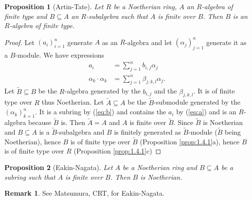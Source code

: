 \documentclass[DIV=14,parskip=half]{scrartcl}
\newtheorem{prop}{Proposition}[subsection]
\theoremstyle{definition}
\newtheorem{rem}{Remark}[subsection]
\begin{document}
 \begin{prop}[Artin-Tate]\label{prop:artinTate}
  Let $R$ be a Noetherian ring, $A$ an $R$-algebra of finite type and $B\subseteq A$ an $R$-subalgebra such that $A$ is finite over $B$. Then $B$ is an $R$-algebra of finite type.
 \end{prop}
 \begin{proof}
 Let $(a_i)_{i=1}^n$ generate $A$ as an $R$-algebra and let $(\alpha_j)_{j=1}^n$ generate it as a $B$-module. We have expressions
 \begin{align*}
  a_i &=\sum_{j=1}^n b_{i,j} \alpha_j\label{eq:a}\tag{*}\\
  \alpha_k\cdot \alpha_k &= \sum_{j=1}^n \beta_{j,k,l} \alpha_j.\label{eq:b}\tag{**}
 \end{align*}
Let $\tilde B\subseteq B$ be the $R$-algebra generated by the $b_{i,j}$ and the $\beta_{j,k,l}$. It is of finite type over $R$ thus Noetherian. Let $\tilde A\subseteq A$ be the $\tilde B$-submodule generated by the $(\alpha_k)_{k=1}^n$. It is a subring by (\ref{eq:b}) and contains the $a_i$ by (\ref{eq:a}) and is an $R$-algebra because $\tilde B$ is. Then $\tilde A=A$ and $A$ is finite over $\tilde B$. Since $\tilde B$ is Noetherian and $B\subseteq A$ is a $\tilde B$-subalgebra and $B$ is finitely generated as $\tilde B$-module ($\tilde B$ being Noetherian), hence $B$ is of finite type over $\tilde B$ (Proposition \ref{prop:1.4.1}a), hence $B$ is of finite type over $R$ (Proposition \ref{prop:1.4.1}c)
\end{proof}
\begin{prop}[Eakin-Nagata]\label{prop:eakinNagata}
 Let $A$ be a Noetherian ring and $B\subseteq A$ be a subring such that $A$ is finite over $B$. Then $B$ is Noetherian.
\end{prop}
\begin{rem}
 See Matsumura, CRT, for Eakin-Nagata.
\end{rem}
\end{document}
